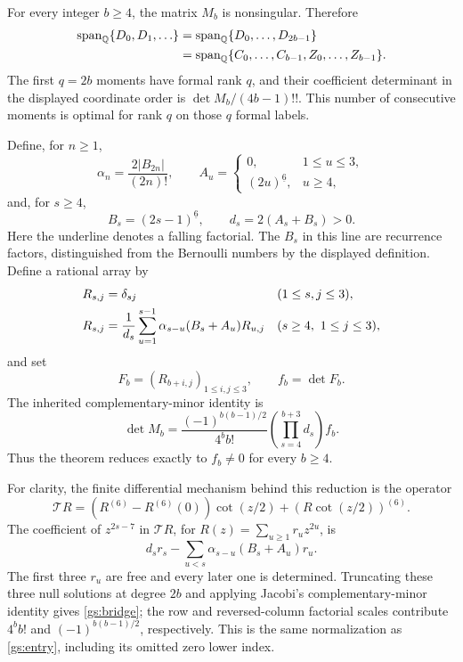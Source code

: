 \begin{theorem}
\label{gs:main}
For every integer $b\ge4$, the matrix $M_b$ is nonsingular.  Therefore
\begin{align}\label{gs:span}
 \operatorname{span}_{\mathbb Q}\{D_0,D_1,\ldots\}
 &=\operatorname{span}_{\mathbb Q}\{D_0,\ldots,D_{2b-1}\}\\
 &=\operatorname{span}_{\mathbb Q}
 \{C_0,\ldots,C_{b-1},Z_0,\ldots,Z_{b-1}\}.\notag
\end{align}
The first $q=2b$ moments have formal rank $q$, and their coefficient
determinant in the displayed coordinate order is
$\det M_b/(4b-1)!!$.  This number of consecutive moments is optimal
for rank $q$ on those $q$ formal labels.
\end{theorem}

Define, for $n\ge1$,
\[
 \alpha_n=\frac{2|B_{2n}|}{(2n)!},\qquad
 A_u=\begin{cases}0,&1\le u\le3,\\
                   (2u)^{\underline6},&u\ge4,
       \end{cases}
\]
and, for $s\ge4$,
\[
 B_s=(2s-1)^{\underline6},\qquad d_s=2(A_s+B_s)>0.
\]
Here the underline denotes a falling factorial.  The $B_s$ in this
line are recurrence factors, distinguished from the Bernoulli numbers
by the displayed definition.  Define a rational array by
\begin{align}
 R_{s,j}&=\delta_{sj}&&(1\le s,j\le3),\notag\\
 R_{s,j}&=\frac1{d_s}\sum_{u=1}^{s-1}
             \alpha_{s-u}(B_s+A_u)R_{u,j}
           &&(s\ge4,\ 1\le j\le3),\label{gs:recurrence}
\end{align}
and set
\[
 F_b=(R_{b+i,j})_{1\le i,j\le3},\qquad f_b=\det F_b.
\]
The inherited complementary-minor identity
\cite[Section~8, fixed-gap boundary reduction]{OrderedIncoming} is
\begin{equation}\label{gs:bridge}
 \det M_b=\frac{(-1)^{b(b-1)/2}}{4^bb!}
        \left(\prod_{s=4}^{b+3}d_s\right)f_b.
\end{equation}
Thus the theorem reduces exactly to $f_b\ne0$ for every $b\ge4$.

For clarity, the finite differential mechanism behind this reduction
is the operator
\[
 \mathcal T R=(R^{(6)}-R^{(6)}(0))\cot(z/2)
                       +(R\cot(z/2))^{(6)}.
\]
The coefficient of $z^{2s-7}$ in $\mathcal T R$, for
$R(z)=\sum_{u\ge1}r_uz^{2u}$, is
\[
 d_sr_s-\sum_{u<s}\alpha_{s-u}(B_s+A_u)r_u.
\]
The first three $r_u$ are free and every later one is determined.
Truncating these three null solutions at degree $2b$ and applying
Jacobi's complementary-minor identity gives \eqref{gs:bridge}; the
row and reversed-column factorial scales contribute $4^bb!$ and
$(-1)^{b(b-1)/2}$, respectively.  This is the same normalization as
\eqref{gs:entry}, including its omitted zero lower index.

